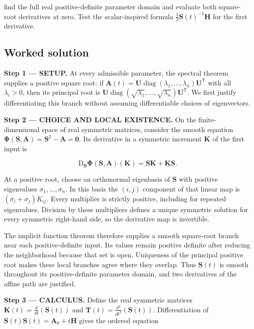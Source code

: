 \documentclass[11pt,oneside,openany]{book}
\begin{document}
find the full real positive-definite parameter domain and evaluate both square-root derivatives at zero. Test the scalar-inspired formula \(\frac12\mathbf S(t)^{-1}\mathbf H\) for the first derivative.
\subsection*{Worked solution}

\textbf{Step 1 --- SETUP.} At every admissible parameter, the spectral theorem supplies a positive square root: if \(\mathbf A(t)=\mathbf U\operatorname{diag}(\lambda_1,\ldots,\lambda_n)\mathbf U^{\mathsf T}\) with all \(\lambda_i>0\), then its principal root is \(\mathbf U\operatorname{diag}(\sqrt{\lambda_1},\ldots,\sqrt{\lambda_n})\mathbf U^{\mathsf T}\). We first justify differentiating this branch without assuming differentiable choices of eigenvectors.

\begin{ChoiceStep}
\textbf{Step 2 --- CHOICE AND LOCAL EXISTENCE.} On the finite-dimensional space of real symmetric matrices, consider the smooth equation \(\boldsymbol\Phi(\mathbf S,\mathbf A)=\mathbf S^2-\mathbf A=\mathbf0\). Its derivative in a symmetric increment \(\mathbf K\) of the first input is

\[
\mathrm D_{\mathbf S}\boldsymbol\Phi(\mathbf S,\mathbf A)(\mathbf K)
=\mathbf S\mathbf K+\mathbf K\mathbf S.
\]

At a positive root, choose an orthonormal eigenbasis of \(\mathbf S\) with positive eigenvalues \(\sigma_1,\ldots,\sigma_n\). In this basis the \((i,j)\) component of that linear map is \((\sigma_i+\sigma_j)K_{ij}\). Every multiplier is strictly positive, including for repeated eigenvalues. Division by these multipliers defines a unique symmetric solution for every symmetric right-hand side, so the derivative map is invertible.

The implicit function theorem therefore supplies a smooth square-root branch near each positive-definite input. Its values remain positive definite after reducing the neighborhood because that set is open. Uniqueness of the principal positive root makes these local branches agree where they overlap. Thus \(\mathbf S(t)\) is smooth throughout its positive-definite parameter domain, and two derivatives of the affine path are justified.

\end{ChoiceStep}
\textbf{Step 3 --- CALCULUS.} Define the real symmetric matrices \(\mathbf K(t)=\frac{d}{dt}(\mathbf S(t))\) and \(\mathbf T(t)=\frac{d^2}{dt^2}(\mathbf S(t))\). Differentiation of \(\mathbf S(t)\mathbf S(t)=\mathbf A_0+t\mathbf H\) gives the ordered equation
\end{document}
